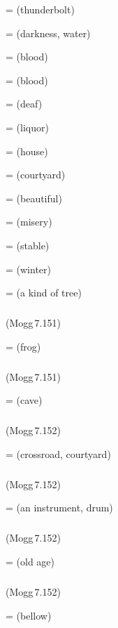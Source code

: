  =  (thunderbolt)\par
{} =  (darkness, water)\par
{} =  (blood)\par
{} =  (blood)\par
{} =  (deaf)\par
{} =  (liquor)\par
{} =  (house)\par
{} =  (courtyard)\par
{} =  (beautiful)\par
{} =  (misery)\par
{} =  (stable)\par
{} =  (winter)\par
{} =  (a kind of tree)\par

\subparagraph*{} (Mogg\,7.151)\label{pacckx:dura}

 =  (frog)\par

\subparagraph*{} (Mogg\,7.151)\label{pacckx:bhara}

 =  (cave)\par

\subparagraph*{} (Mogg\,7.152)\label{pacckx:cara}

 =  (crossroad, courtyard)\par

\subparagraph*{} (Mogg\,7.152)\label{pacckx:dara}

 =  (an instrument, drum)\par

\subparagraph*{} (Mogg\,7.152)\label{pacckx:jara}

 =  (old age)\par

\subparagraph*{} (Mogg\,7.152)\label{pacckx:gara}

 =  (bellow)\par

